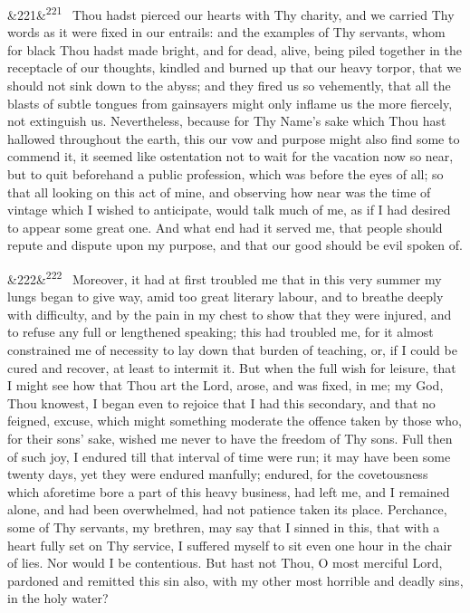 \documentclass[12pt]{article}
\newcommand{\para}[1][]{\par\noindent\ifx&#1&\else\textsuperscript{\footnotesize #1}~\fi}
\begin{document}
\para[221] Thou hadst pierced our hearts with Thy charity, and we carried Thy words as it were fixed in our entrails: and the examples of Thy servants, whom for black Thou hadst made bright, and for dead, alive, being piled together in the receptacle of our thoughts, kindled and burned up that our heavy torpor, that we should not sink down to the abyss; and they fired us so vehemently, that all the blasts of subtle tongues from gainsayers might only inflame us the more fiercely, not extinguish us. Nevertheless, because for Thy Name's sake which Thou hast hallowed throughout the earth, this our vow and purpose might also find some to commend it, it seemed like ostentation not to wait for the vacation now so near, but to quit beforehand a public profession, which was before the eyes of all; so that all looking on this act of mine, and observing how near was the time of vintage which I wished to anticipate, would talk much of me, as if I had desired to appear some great one. And what end had it served me, that people should repute and dispute upon my purpose, and that our good should be evil spoken of.

\para[222] Moreover, it had at first troubled me that in this very summer my lungs began to give way, amid too great literary labour, and to breathe deeply with difficulty, and by the pain in my chest to show that they were injured, and to refuse any full or lengthened speaking; this had troubled me, for it almost constrained me of necessity to lay down that burden of teaching, or, if I could be cured and recover, at least to intermit it. But when the full wish for leisure, that I might see how that Thou art the Lord, arose, and was fixed, in me; my God, Thou knowest, I began even to rejoice that I had this secondary, and that no feigned, excuse, which might something moderate the offence taken by those who, for their sons' sake, wished me never to have the freedom of Thy sons. Full then of such joy, I endured till that interval of time were run; it may have been some twenty days, yet they were endured manfully; endured, for the covetousness which aforetime bore a part of this heavy business, had left me, and I remained alone, and had been overwhelmed, had not patience taken its place. Perchance, some of Thy servants, my brethren, may say that I sinned in this, that with a heart fully set on Thy service, I suffered myself to sit even one hour in the chair of lies. Nor would I be contentious. But hast not Thou, O most merciful Lord, pardoned and remitted this sin also, with my other most horrible and deadly sins, in the holy water?
\end{document}
